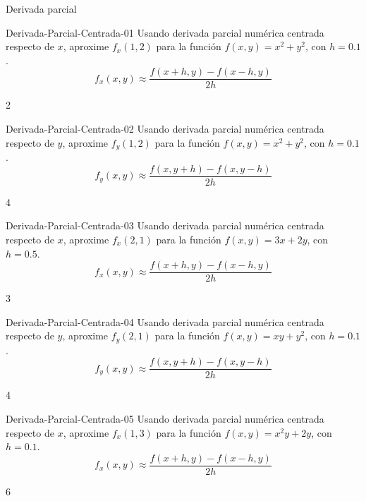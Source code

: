 \documentclass[a4,11pt]{aleph-notas}
\begin{document}
\begin{quiz}{Derivada parcial}
\begin{numerical}[tolerance=0.01]%
    {Derivada-Parcial-Centrada-01}
    Usando derivada parcial numérica centrada respecto de \(x\), aproxime \( f_x(1,2) \) para la función \( f(x,y)=x^2+y^2 \), con \( h=0.1 \).
    \[
        f_x(x,y)\approx \frac{f(x+h,y)-f(x-h,y)}{2h}
    \]
    \item 2
\end{numerical}

\begin{numerical}[tolerance=0.01]%
    {Derivada-Parcial-Centrada-02}
    Usando derivada parcial numérica centrada respecto de \(y\), aproxime \( f_y(1,2) \) para la función \( f(x,y)=x^2+y^2 \), con \( h=0.1 \).
    \[
        f_y(x,y)\approx \frac{f(x,y+h)-f(x,y-h)}{2h}
    \]
    \item 4
\end{numerical}

\begin{numerical}[tolerance=0.01]%
    {Derivada-Parcial-Centrada-03}
    Usando derivada parcial numérica centrada respecto de \(x\), aproxime \( f_x(2,1) \) para la función \( f(x,y)=3x+2y \), con \( h=0.5 \).
    \[
        f_x(x,y)\approx \frac{f(x+h,y)-f(x-h,y)}{2h}
    \]
    \item 3
\end{numerical}

\begin{numerical}[tolerance=0.01]%
    {Derivada-Parcial-Centrada-04}
    Usando derivada parcial numérica centrada respecto de \(y\), aproxime \( f_y(2,1) \) para la función \( f(x,y)=xy+y^2 \), con \( h=0.1 \).
    \[
        f_y(x,y)\approx \frac{f(x,y+h)-f(x,y-h)}{2h}
    \]
    \item 4
\end{numerical}

\begin{numerical}[tolerance=0.01]%
    {Derivada-Parcial-Centrada-05}
    Usando derivada parcial numérica centrada respecto de \(x\), aproxime \( f_x(1,3) \) para la función \( f(x,y)=x^2y+2y \), con \( h=0.1 \).
    \[
        f_x(x,y)\approx \frac{f(x+h,y)-f(x-h,y)}{2h}
    \]
    \item 6
\end{numerical}

\end{quiz}
\end{document}
